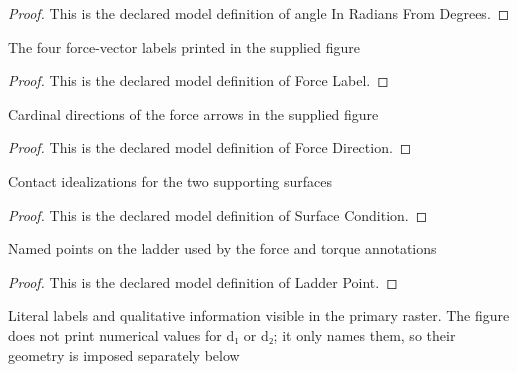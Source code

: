 \begin{proof}
  This is the declared model definition of angle In Radians From Degrees.
\end{proof}
\begin{definition}
  \label{def:physics:phyx-mini-0709:phyxminiproblems-problemphyxmini0709-forcelabel}
  The four force-vector labels printed in the supplied figure
\end{definition}
\begin{proof}
  This is the declared model definition of Force Label.
\end{proof}
\begin{definition}
  \label{def:physics:phyx-mini-0709:phyxminiproblems-problemphyxmini0709-forcedirection}
  Cardinal directions of the force arrows in the supplied figure
\end{definition}
\begin{proof}
  This is the declared model definition of Force Direction.
\end{proof}
\begin{definition}
  \label{def:physics:phyx-mini-0709:phyxminiproblems-problemphyxmini0709-surfacecondition}
  Contact idealizations for the two supporting surfaces
\end{definition}
\begin{proof}
  This is the declared model definition of Surface Condition.
\end{proof}
\begin{definition}
  \label{def:physics:phyx-mini-0709:phyxminiproblems-problemphyxmini0709-ladderpoint}
  Named points on the ladder used by the force and torque annotations
\end{definition}
\begin{proof}
  This is the declared model definition of Ladder Point.
\end{proof}
\begin{definition}
  \label{def:physics:phyx-mini-0709:phyxminiproblems-problemphyxmini0709-ladderstaticsfigure}
  Literal labels and qualitative information visible in the primary raster. The figure does not print numerical values for d₁ or d₂; it only names them, so their geometry is imposed separately below
\end{definition}
